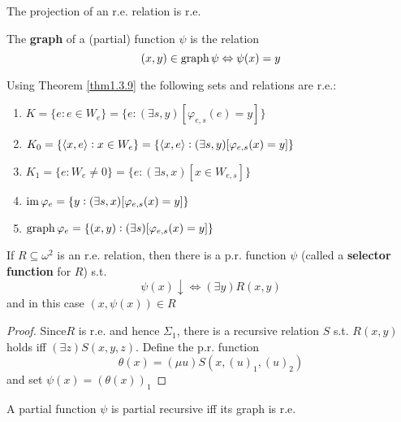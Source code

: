 \documentclass[11pt]{article}
\begin{document}
\begin{corollary}[]
\label{cor2.1.4}
The projection of an r.e. relation is r.e.
\end{corollary}

\begin{definition}[]
The \textbf{graph} of a (partial) function \(\psi\) is the relation
\begin{equation*}
(x,y)\in\operatorname{graph}\psi\Leftrightarrow\psi(x)=y
\end{equation*}
\end{definition}

Using Theorem \ref{thm1.3.9} the following sets and relations are r.e.:
\begin{enumerate}
\item \(K=\{e:e\in W_e\}=\{e:(\exists s,y)[\varphi_{e,s}(e)=y]\}\)
\item \(K_0=\{\langle x,e\rangle:x\in W_e\}=\{\langle x,e\rangle:(\exists s,y)[\varphi_{e,s}(x)=y]\}\)
\item \(K_1=\{e:W_e\neq0\}=\{e:(\exists s,x)[x\in W_{e,s}]\}\)
\item \(\operatorname{im}\varphi_e=\{y:(\exists s,x)[\varphi_{e,s}(x)=y]\}\)
\item \(\operatorname{graph}\varphi_e=\{(x,y):(\exists s)[\varphi_{e,s}(x)=y]\}\)
\end{enumerate}


\begin{theorem}
\label{thm2.1.6}
If \(R\subseteq\omega^2\) is an r.e. relation, then there is a p.r. function
\(\psi\) (called a \textbf{selector function} for \(R\)) s.t.
\begin{equation*}
\psi(x)\downarrow\Leftrightarrow(\exists y)R(x,y)
\end{equation*}
and in this case \((x,\psi(x))\in R\)
\end{theorem}

\begin{proof}
Since\(R\) is r.e. and hence \(\Sigma_1\), there is a recursive relation
\(S\) s.t. \(R(x,y)\) holds iff \((\exists z)S(x,y,z)\). Define the p.r.
function
\begin{equation*}
\theta(x)=(\mu u)S(x,(u)_1,(u)_2)
\end{equation*}
and set \(\psi(x)=(\theta(x))_1\)
\end{proof}

\begin{theorem}
\label{thm2.1.7}
A partial function \(\psi\) is partial recursive iff its graph is r.e.
\end{theorem}
\end{document}
